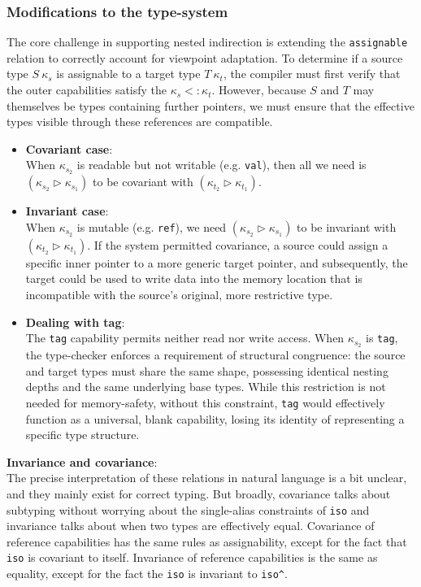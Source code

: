 \documentclass[a4paper,12pt,fleqn]{article}
\begin{document}
\subsubsection{Modifications to the type-system}
The core challenge in supporting nested indirection is extending the \texttt{assignable} relation to correctly account for viewpoint adaptation. To determine if a source type $S\ \kappa_s$ is assignable to a target type $T\ \kappa_t$, the compiler must first verify that the outer capabilities satisfy the $\kappa_s <: \kappa_t$. However, because $S$ and $T$ may themselves be types containing further pointers, we must ensure that the effective types visible through these references are compatible.
\begin{itemize}
  \item \textbf{Covariant case}:\\ When $\kappa_{s_2}$ is readable but not writable (e.g. \texttt{val}), then all we need is $(\kappa_{s_2} \triangleright \kappa_{s_1})$ to be covariant with $(\kappa_{t_2} \triangleright \kappa_{t_1})$.
  \item \textbf{Invariant case}:\\ When $\kappa_{s_2}$ is mutable (e.g. \texttt{ref}), we need $(\kappa_{s_2} \triangleright \kappa_{s_1})$ to be invariant with $(\kappa_{t_2} \triangleright \kappa_{t_1})$. If the system permitted covariance, a source could assign a specific inner pointer to a more generic target pointer, and subsequently, the target could be used to write data into the memory location that is incompatible with the source's original, more restrictive type.
  \item \textbf{Dealing with tag}:\\ The \texttt{tag} capability permits neither read nor write access. When $\kappa_{s_2}$ is \texttt{tag}, the type-checker enforces a requirement of structural congruence: the source and target types must share the same shape, possessing identical nesting depths and the same underlying base types. While this restriction is not needed for memory-safety, without this constraint, \texttt{tag} would effectively function as a universal, blank capability, losing its identity of representing a specific type structure.
\end{itemize}

\begin{notebox}
\textbf{Invariance and covariance}:\\
The precise interpretation of these relations in natural language is a bit unclear, and they mainly exist for correct typing. But broadly, covariance talks about subtyping without worrying about the single-alias constraints of \texttt{iso} and invariance talks about when two types are effectively equal. Covariance of reference capabilities has the same rules as assignability, except for the fact that \texttt{iso} is covariant to itself. Invariance of reference capabilities is the same as equality, except for the fact the \texttt{iso} is invariant to \texttt{iso\textasciicircum}.
\end{notebox} 
\end{document}
